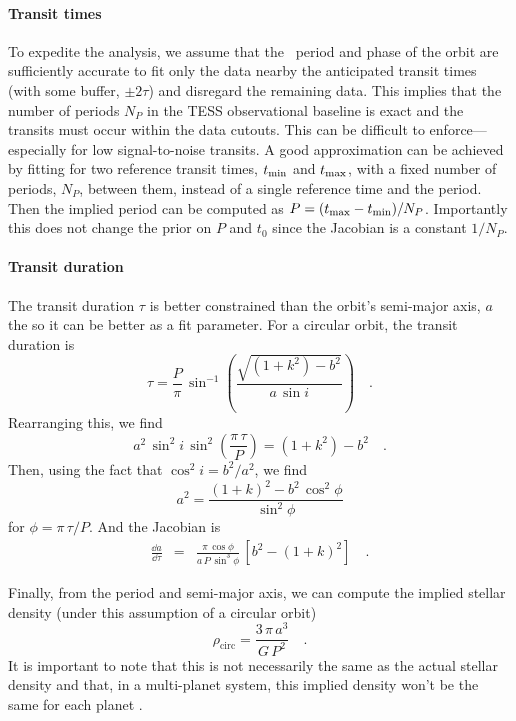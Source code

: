 \documentclass[floatfix,ApJL,twocolumn]{aastex631}
\begin{document}
\paragraph{Transit times}
To expedite the analysis, we assume that the \exofop\ period and phase of the orbit are sufficiently accurate to fit only the data nearby the anticipated transit times (with some buffer, $\pm2\tau$) and disregard the remaining data.
This implies that the number of periods $N_P$ in the TESS observational baseline is exact and the transits must occur within the data cutouts.
This can be difficult to enforce---especially for low signal-to-noise transits. 
A good approximation can be achieved by fitting for two reference transit times, $t_{\rm min}$ and $t_{\rm max}$, with a fixed number of periods, $N_P$, between them, instead of a single reference time and the period.
Then the implied period can be computed as $P = (t_{\rm max} - t_{\rm min}) / N_P$.
Importantly this does not change the prior on $P$ and $t_0$ since the Jacobian is a constant $1/N_P$.


\paragraph{Transit duration}
The transit duration $\tau$ is better constrained than the orbit's semi-major axis, $a$ the so it can be better as a fit parameter.
For a circular orbit, the transit duration is \citep{Winn:2010}
\begin{equation}
  \tau = \frac{P}{\pi}\,\sin^{-1}\left( \frac{\sqrt{(1 + k^2) - b^2}}{a\,\sin i} \right) \quad.
\end{equation}
Rearranging this, we find
\begin{equation}
  a^2\,\sin^2 i\,\sin^2\left(\frac{\pi\,\tau}{P}\right) = (1 + k^2) - b^2 \quad.
\end{equation}
Then, using the fact that $\cos^2 i = b^2 / a^2$, we find
\begin{equation}
  a^2 = \frac{(1 + k)^2 - b^2\,\cos^2\phi}{\sin^2\phi}
\end{equation}
for $\phi = \pi\,\tau / P$.
And the Jacobian is
\begin{eqnarray}
  \frac{\dd a}{\dd \tau} &=& \frac{\pi\,\cos \phi}{a\,P\,\sin^3 \phi}\,\left[b^2 - (1 + k)^2\right] \quad.
\end{eqnarray}

Finally, from the period and semi-major axis, we can compute the implied stellar density (under this assumption of a circular orbit)
\begin{equation}
  \rho_\mathrm{circ} = \frac{3\,\pi\,a^3}{G\,P^2} \quad.
\end{equation}
It is important to note that this is not necessarily the same as the actual stellar density and that, in a multi-planet system, this implied density won't be the same for each planet \citep[see, for example,][]{Dawson:2012, Kipping:2012}.
\end{document}
